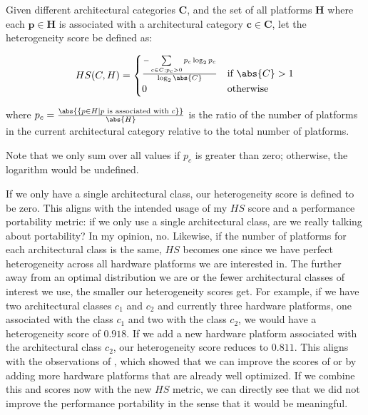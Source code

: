 \begin{definition}\label{def:hetero_score}
Given different architectural categories $\mathbf{C}$, and the set of all platforms $\mathbf{H}$ where each $\mathbf{p \in H}$ is associated with a architectural category $\mathbf{c \in C}$, let the heterogeneity score be defined as:

$$HS(C, H) = \begin{cases}
                \frac{-\sum\limits_{c \in C; p_c > 0} p_c \log_2 p_c}{\log_2\abs{C}} & \text{if } \abs{C} > 1 \\
                0                                                                    & \text{otherwise}
              \end{cases}$$

where $p_c = \frac{\abs{\{ p \in H \mid p \text{ is associated with } c \}}}{\abs{H}}$ is the ratio of the number of platforms in the current architectural category relative to the total number of platforms. 
\end{definition}

Note that we only sum over all values if $p_c$ is greater than zero; otherwise, the logarithm would be undefined. 

If we only have a single architectural class, our heterogeneity score is defined to be zero. 
This aligns with the intended usage of my $HS$ score and a performance portability metric: if we only use a single architectural class, are we really talking about portability? 
In my opinion, no. 
Likewise, if the number of platforms for each architectural class is the same, $HS$ becomes one since we have perfect heterogeneity across all hardware platforms we are interested in. 
The further away from an optimal distribution we are or the fewer architectural classes of interest we use, the smaller our heterogeneity scores get. 
For example, if we have two architectural classes $c_1$ and $c_2$ and currently three hardware platforms, one associated with the class $c_1$ and two with the class $c_2$, we would have a heterogeneity score of $\num{0.918}$. 
If we add a new hardware platform associated with the architectural class $c_2$, our heterogeneity score reduces to $\num{0.811}$. 
This aligns with the observations of \citet{yokota_beginners_2018}, which showed that we can improve the scores of \pp or \mpp by adding more hardware platforms that are already well optimized. 
If we combine this \pp and \mpp scores now with the new $HS$ metric, we can directly see that we did not improve the performance portability in the sense that it would be meaningful. 

